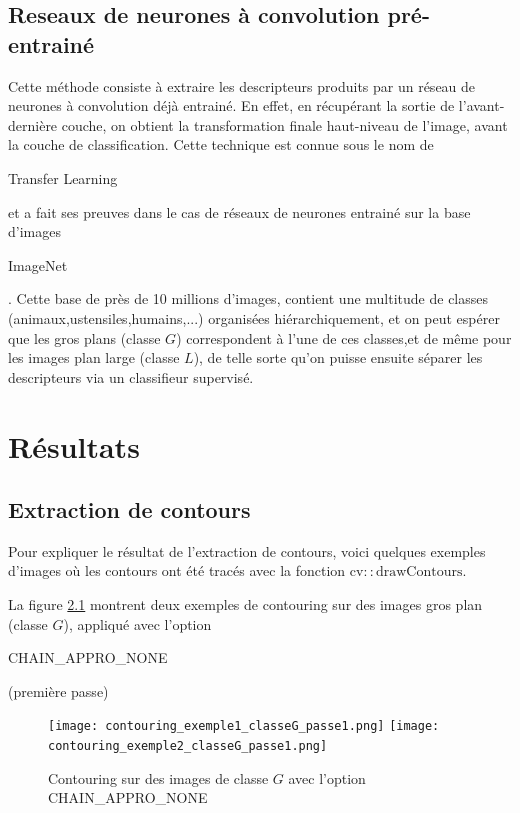 \documentclass{book}
\begin{document}
\section{Reseaux de neurones à convolution pré-entrainé}

Cette méthode consiste à extraire les descripteurs produits par un réseau de neurones à convolution déjà entrainé.
En effet, en récupérant la sortie de l'avant-dernière couche, on obtient la transformation finale haut-niveau de l'image, 
avant la couche de classification.
Cette technique est connue sous le nom de \begin{itshape}Transfer Learning\end{itshape} \cite{DBLP:journals/corr/YosinskiCBL14} 
et a fait ses preuves dans le cas de réseaux de neurones entrainé sur la base 
d'images \begin{itshape}ImageNet\end{itshape} \cite{imagenet_cvpr09}.
Cette base de près de 10 millions d'images, contient une multitude de classes (animaux,ustensiles,humains,...) organisées hiérarchiquement, 
et on peut espérer que les gros plans (classe $G$) correspondent à l'une de ces classes,et de même pour les images plan 
large (classe $L$), de telle sorte qu'on puisse ensuite séparer les descripteurs via un classifieur 
supervisé.

\chapter{Résultats}
\section{Extraction de contours}
Pour expliquer le résultat de l’extraction de contours, voici quelques exemples d'images où les contours ont été tracés avec 
la fonction $\mathrm{cv::drawContours}$.

La figure \ref{contouringG1} montrent deux exemples de contouring sur des images \og gros plan \fg{} (classe $G$), appliqué
avec l'option \begin{itshape}CHAIN\_APPRO\_NONE\end{itshape} (première passe)

\begin{figure}[H]
\begin{center}
\texttt{[image: contouring\_exemple1\_classeG\_passe1.png]}
\texttt{[image: contouring\_exemple2\_classeG\_passe1.png]}
\end{center}
\caption{Contouring sur des images de classe $G$ avec l'option CHAIN\_APPRO\_NONE}
\label{contouringG1}
\end{figure}
\end{document}
